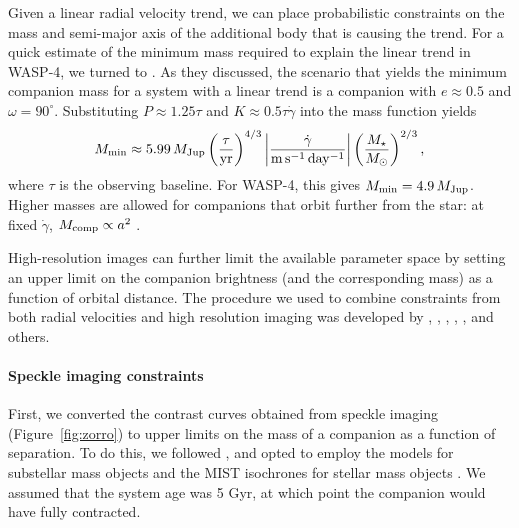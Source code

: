 \documentclass[12pt,twocolumn,tighten]{aastex62}
\begin{document}
Given a linear radial velocity trend, we can place probabilistic
constraints on the mass and semi-major axis of the additional body
that is causing the trend.  For a quick estimate of the minimum mass
required to explain the linear trend in WASP-4, we turned to
\citet{feng_california_2015}.  As they discussed, the scenario that
yields the minimum companion mass for a system with a linear trend is
a companion with $e\approx0.5$ and $\omega=90^\circ$.  Substituting
$P\approx 1.25\tau$ and $K \approx 0.5\tau \dot{\gamma}$ into the mass
function \citep[{\it e.g.},][]{wright_efficient_2009} yields
\begin{equation}
 M_{\rm min} \approx 5.99\,M_{\rm Jup}
  \left( \frac{\tau}{{\rm yr}} \right)^{4/3}
  \left| \frac{\dot{\gamma}}{{\rm m\,s^{-1}\,day^{-1}}} \right|
  \left( \frac{M_\star}{{M_\odot}} \right)^{2/3},
\end{equation}
where $\tau$ is the observing baseline.  For WASP-4, this gives
$M_{\rm min} = 4.9\,M_{\rm Jup}$.  Higher masses are allowed for
companions that orbit further from the star: at fixed $\dot{\gamma}$,
$M_{\rm comp} \propto a^2$
\citep{torres_substellar_1999,liu_crossing_2002}.

High-resolution images can further limit the available parameter space
by setting an upper limit on the companion brightness (and the
corresponding mass) as a function of orbital distance.  The procedure
we used to combine constraints from both radial velocities and high
resolution imaging was developed by \citet{wright_linear_trends_2007},
\citet{crepp_trends_2012}, \citet{montet_trends_2014},
\citet{knutson_friends_2014},
\citet{bryan_statistics_2016,bryan_excess_2019}, and others.

\paragraph{Speckle imaging constraints}

First, we converted the contrast curves obtained from speckle imaging
(Figure~\ref{fig:zorro}) to upper limits on the mass of a companion as
a function of separation. To do this, we followed
\citet{montet_trends_2014}, and opted to employ the
\citet{baraffe_evolutionary_2003} models for substellar mass objects
and the MIST isochrones for stellar mass objects
\citep{paxton_modules_2011,paxton_modules_2013,paxton_modules_2015,dotter_mesa_2016,choi_mesa_2016}.
We assumed that the system age was 5 Gyr, at which point the companion
would have fully contracted.
\end{document}
